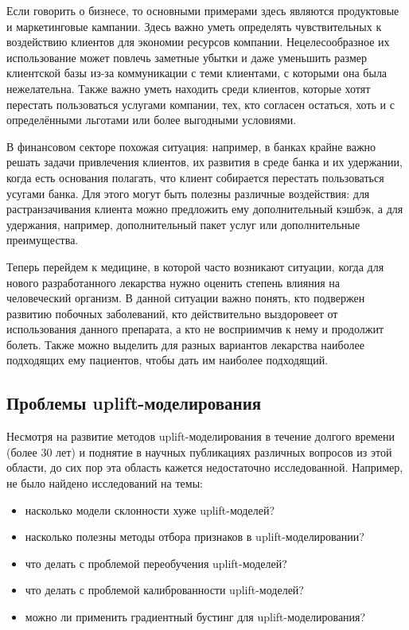 Если говорить о бизнесе, то основными примерами здесь являются продуктовые и маркетинговые кампании. Здесь важно уметь определять чувствительных к воздействию клиентов для экономии ресурсов компании. Нецелесообразное их использование может повлечь заметные убытки и даже уменьшить размер клиентской базы из-за коммуникации с теми клиентами, с которыми она была нежелательна. Также важно уметь находить среди клиентов, которые хотят перестать пользоваться услугами компании, тех, кто согласен остаться, хоть и с определёнными льготами или более выгодными условиями.

В финансовом секторе похожая ситуация: например, в банках крайне важно решать задачи привлечения клиентов, их развития в среде банка и их удержании, когда есть основания полагать, что клиент собирается перестать пользоваться усугами банка. Для этого могут быть полезны различные воздействия: для растранзачивания клиента можно предложить ему дополнительный кэшбэк, а для удержания, например, дополнительный пакет услуг или дополнительные преимущества.

Теперь перейдем к медицине, в которой часто возникают ситуации, когда для нового разработанного лекарства нужно оценить степень влияния на человеческий организм. В данной ситуации важно понять, кто подвержен развитию побочных заболеваний, кто действительно выздоровеет от использования данного препарата, а кто не восприимчив к нему и продолжит болеть. Также можно выделить для разных вариантов лекарства наиболее подходящих ему пациентов, чтобы дать им наиболее подходящий.















\subsection{Проблемы uplift-моделирования}

Несмотря на развитие методов uplift-моделирования в течение долгого времени (более 30 лет) и поднятие в научных публикациях различных вопросов из этой области, до сих пор эта область кажется недостаточно исследованной. Например, не было найдено исследований на темы:
\begin{itemize}
    \item насколько модели склонности хуже uplift-моделей?
    \item насколько полезны методы отбора признаков в uplift-моделировании?
    \item что делать с проблемой переобучения uplift-моделей?
    \item что делать с проблемой калиброванности uplift-моделей?
    \item можно ли применить градиентный бустинг для uplift-моделирования?
\end{itemize}

